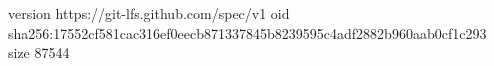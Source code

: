 version https://git-lfs.github.com/spec/v1
oid sha256:17552cf581cac316ef0eecb871337845b8239595c4adf2882b960aab0cf1c293
size 87544
